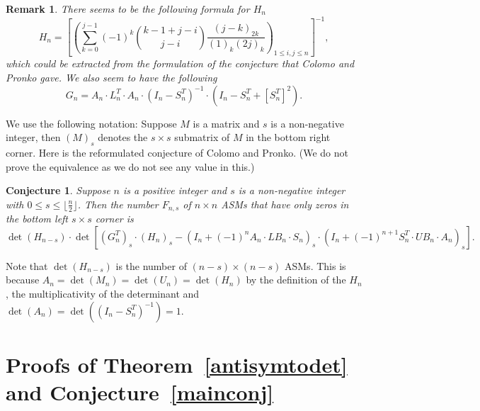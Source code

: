 \documentclass[12pt,dvipsnames]{amsart}
\newtheorem{conj}[theorem]{Conjecture}
\theoremstyle{definition}
\newtheorem{remark}[theorem]{Remark}
\begin{document}
\begin{remark} 
\it There seems to be the following formula for $H_n$
$$
H_n =\left[ \left( \sum_{k=0}^{j-1} (-1)^k \binom{k-1+j-i}{j-i} \frac{(j-k)_{2k}}{(1)_k (2j)_k} \right)_{1 \le i,j \le n} \right]^{-1},
$$
which could be extracted from the formulation of the conjecture that Colomo and Pronko gave. 
We also seem to have the following
$$
G_n = A_n \cdot L_n^{T}  \cdot A_n \cdot  (I_n-S_n^T)^{-1} \cdot (I_n - S_n^T +  \left[ S_n^T \right]^2).
$$
\end{remark} 

We use the following notation: Suppose $M$ is a matrix and $s$ is a non-negative integer, then $(M)_s$ denotes the $s \times s$ submatrix of $M$ in the 
bottom right corner. Here is the reformulated conjecture of Colomo and Pronko. (We do not prove the equivalence 
as we do not see any value in this.)

\begin{conj} Suppose $n$ is a positive integer and $s$ is a non-negative integer with 
$0 \le s \le \lfloor \frac{n}{2} \rfloor$. Then the number $F_{n,s}$ of $n \times n$ ASMs that have only zeros in the bottom left $s \times s$ corner is
$$
\det(H_{n-s}) \cdot \det \left[ (G_n^T)_s \cdot (H_n)_s - (I_n+(-1)^n A_n \cdot LB_n  \cdot S_n)_s \cdot (I_n+(-1)^{n+1} S_n^T \cdot UB_n \cdot A_n)_s \right].
$$
\end{conj}
Note that $\det(H_{n-s})$ is the number of $(n-s) \times (n-s)$ ASMs. This is because 
$A_{n} = \det(M_{n}) = \det(U_{n}) = \det(H_{n})$ by the definition of the $H_n$, the multiplicativity of the determinant and 
$\det(A_{n})=\det \left( (I_n-S_n^T)^{-1} \right)=1$.





\section{Proofs of Theorem~\ref{antisymtodet} and Conjecture~\ref{mainconj}}
\label{proof} 
 
\end{document}
